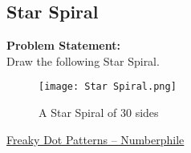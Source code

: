 \subsection{Star Spiral}{\label{pp:starspiral}}
\textbf{Problem Statement:}\\
Draw the following Star Spiral.
\begin{figure}[H]
	\centering
	\texttt{[image: Star Spiral.png]}
	\caption{A Star Spiral of 30 sides}
\end{figure}
\begin{funvideo}
\href{https://youtu.be/QAja2jp1VjE}{Freaky Dot Patterns -- Numberphile}
\end{funvideo}